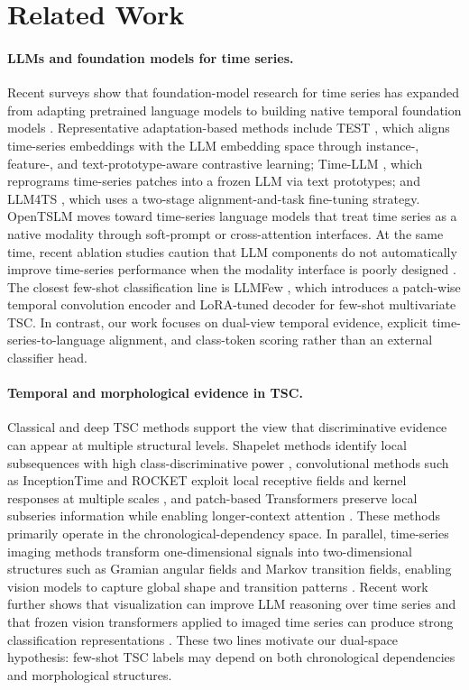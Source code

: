 \documentclass{article}
\begin{document}
\section{Related Work}
\paragraph{LLMs and foundation models for time series.}
Recent surveys show that foundation-model research for time series has expanded from adapting pretrained language models to building native temporal foundation models \cite{zhang2024large,jiang2024empowering,ye2024survey,shi2025large}. Representative adaptation-based methods include TEST \cite{sun2023test}, which aligns time-series embeddings with the LLM embedding space through instance-, feature-, and text-prototype-aware contrastive learning; Time-LLM \cite{jin2024time}, which reprograms time-series patches into a frozen LLM via text prototypes; and LLM4TS \cite{chang2025llm4ts}, which uses a two-stage alignment-and-task fine-tuning strategy. OpenTSLM \cite{langer2025opentslm} moves toward time-series language models that treat time series as a native modality through soft-prompt or cross-attention interfaces. At the same time, recent ablation studies caution that LLM components do not automatically improve time-series performance when the modality interface is poorly designed \cite{tan2024language,zheng2024revisited}. The closest few-shot classification line is LLMFew \cite{chen2025large}, which introduces a patch-wise temporal convolution encoder and LoRA-tuned decoder for few-shot multivariate TSC. In contrast, our work focuses on dual-view temporal evidence, explicit time-series-to-language alignment, and class-token scoring rather than an external classifier head.

\paragraph{Temporal and morphological evidence in TSC.}
Classical and deep TSC methods support the view that discriminative evidence can appear at multiple structural levels. Shapelet methods identify local subsequences with high class-discriminative power \cite{ye2009shapelets,tang2020interpretable}, convolutional methods such as InceptionTime and ROCKET exploit local receptive fields and kernel responses at multiple scales \cite{fawaz2020inceptiontime,dempster2020rocket}, and patch-based Transformers preserve local subseries information while enabling longer-context attention \cite{nietime}. These methods primarily operate in the chronological-dependency space. In parallel, time-series imaging methods transform one-dimensional signals into two-dimensional structures such as Gramian angular fields and Markov transition fields, enabling vision models to capture global shape and transition patterns \cite{wang2015imaging}. Recent work further shows that visualization can improve LLM reasoning over time series and that frozen vision transformers applied to imaged time series can produce strong classification representations \cite{liu2025picture,roschmann2025time}. These two lines motivate our dual-space hypothesis: few-shot TSC labels may depend on both chronological dependencies and morphological structures.
\end{document}
